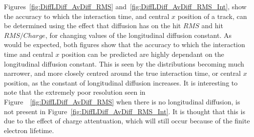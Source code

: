 Figures~\ref{fig:DiffLDiff_AvDiff_RMS} and~\ref{fig:DiffLDiff_AvDiff_RMS_Int}, show the accuracy to which the interaction time, and central $x$ position of a track, can be determined using the effect that diffusion has on the hit $RMS$ and hit $RMS/Charge$, for changing values of the longitudinal diffusion constant. As would be expected, both figures show that the accuracy to which the interaction time and central $x$ position can be predicted are highly dependant on the longitudinal diffusion constant. This is seen by the distributions becoming much narrower, and more closely centred around the true interaction time, or central $x$ position, as the constant of longitudinal diffusion increases. It is interesting to note that the extremely poor resolution seen in Figure~~\ref{fig:DiffLDiff_AvDiff_RMS} when there is no longitudinal diffusion, is not present in Figure~\ref{fig:DiffLDiff_AvDiff_RMS_Int}. It is thought that this is due to the effect of charge attentuation, which will still occur because of the finite electron lifetime. 

